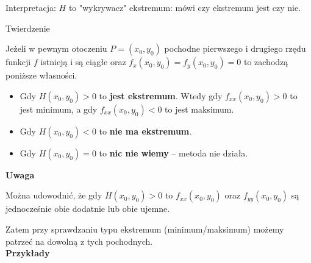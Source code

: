 Interpretacja: $H$ to "wykrywacz" ekstremum: mówi czy ekstremum jest czy nie. \\

\begin{tw}{Twierdzenie}

Jeżeli w pewnym otoczeniu $ P = (x_0, y_0) $ pochodne pierwszego i drugiego rzędu funkcji $f$ istnieją i są ciągłe oraz
$ f_x(x_0, y_0) = f_y(x_0, y_0) = 0 $ to zachodzą poniższe własności.

\begin{itemize}
    \item Gdy $ H(x_0, y_0) > 0 $ to \textbf{jest ekstremum}. Wtedy gdy $ f_{xx}(x_0, y_0) > 0 $ to jest minimum,
    a gdy $ f_{xx}(x_0, y_0) < 0 $ to jest maksimum.
    \item Gdy $ H(x_0, y_0) < 0 $ to \textbf{nie ma ekstremum}.
    \item Gdy $ H(x_0, y_0) = 0 $ to \textbf{nic nie wiemy} -- metoda nie działa.
\end{itemize}
\end{tw}

\textbf{Uwaga}

Można udowodnić, że gdy $ H(x_0, y_0) > 0 $ to $ f_{xx}(x_0, y_0) $ oraz $ f_{yy}(x_0, y_0) $ są jednocześnie obie dodatnie
lub obie ujemne.

Zatem przy sprawdzaniu typu ekstremum (minimum/maksimum) możemy patrzeć na dowolną z tych pochodnych. \\

\textbf{Przykłady}

